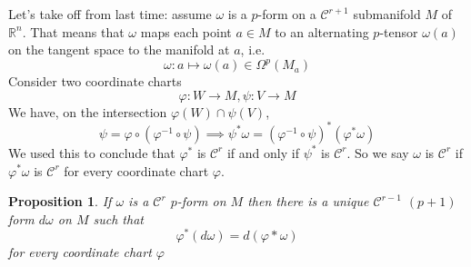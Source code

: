 \documentclass{article}
\newtheorem{proposition}{Proposition}
\newcommand{\reals}[0]{\mathbb{R}}
\newcommand{\mc}[1]{\mathcal{#1}}
\begin{document}
Let's take off from last time: assume \(\omega\) is a \(p\)-form on a \(\mc{C}^{r+1}\) submanifold \(M\) of \(\reals^n\). That means that \(\omega\) maps each point \(a \in M\) to an alternating \(p\)-tensor \(\omega(a)\) on the tangent space to the manifold at \(a\), i.e.
\begin{equation}\omega : a \mapsto \omega(a) \in \Omega^p(M_a)\end{equation}
Consider two coordinate charts
\begin{equation}\varphi: W \to M, \psi: V \to M\end{equation}
We have, on the intersection \(\varphi(W) \cap \psi(V)\),
\begin{equation}\psi = \varphi \circ (\varphi^{-1} \circ \psi) \implies \psi^*\omega = (\varphi^{-1} \circ \psi)^*(\varphi^*\omega)\end{equation}
We used this to conclude that \(\varphi^*\) is \(\mc{C}^r\) if and only if \(\psi^*\) is \(\mc{C}^r\). So we say \(\omega\) is \(\mc{C}^r\) if \(\varphi^*\omega\) is \(\mc{C}^r\) for every coordinate chart \(\varphi\).
\begin{proposition}
  If \(\omega\) is a \(\mc{C}^r\) \(p\)-form on \(M\) then there is a unique \(\mc{C}^{r - 1}\) \((p + 1)\) form \(d\omega\) on \(M\) such that
  \begin{equation}
    \varphi^*(d\omega) = d(\varphi*\omega)
  \end{equation}
  for every coordinate chart \(\varphi\)
\end{proposition}
\end{document}
